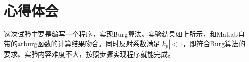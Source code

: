 \documentclass[11pt,a4paper]{ctexart}
\begin{document}
\section{心得体会}
这次试验主要是编写一个程序，实现Burg算法。实验结果如上所示，和Matlab自带的arburg函数的计算结果吻合。同时反射系数满足$|k_{p}|<1$，即符合Burg算法的要求。实验内容难度不大，按照步骤实现程序就能完成。
\end{document}
